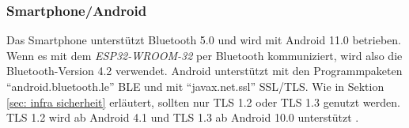 \subsubsection{Smartphone/Android}
Das Smartphone unterstützt Bluetooth 5.0 und wird mit Android 11.0 betrieben. Wenn es mit dem \textit{ESP32-WROOM-32} per Bluetooth kommuniziert, wird also die Bluetooth-Version 4.2 verwendet. Android unterstützt mit den Programmpaketen "`android.bluetooth.le"' \cite{android_le} BLE und mit "`javax.net.ssl"' \cite{android_ssl} SSL/TLS. Wie in Sektion \ref{sec: infra sicherheit} erläutert, sollten nur TLS 1.2 oder TLS 1.3 genutzt werden. TLS 1.2 wird ab Android 4.1 und TLS 1.3 ab Android 10.0 unterstützt \cite{android_ssl_context}.